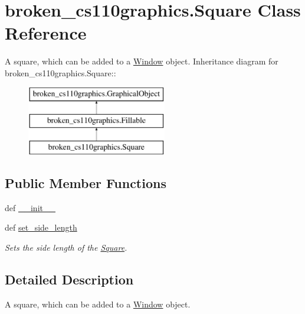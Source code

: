 \hypertarget{classbroken__cs110graphics_1_1Square}{
\section{broken\_\-cs110graphics.Square Class Reference}
\label{classbroken__cs110graphics_1_1Square}
}


A square, which can be added to a \hyperlink{classbroken__cs110graphics_1_1Window}{Window} object.  
Inheritance diagram for broken\_\-cs110graphics.Square::\begin{figure}[H]
\begin{center}
\leavevmode
\includegraphics[height=3cm]{classbroken__cs110graphics_1_1Square}
\end{center}
\end{figure}
\subsection*{Public Member Functions}
\begin{DoxyCompactItemize}
\item 
def \hyperlink{classbroken__cs110graphics_1_1Square_a5225b2da51147ae4f531ee753b304194}{\_\-\_\-init\_\-\_\-}
\item 
def \hyperlink{classbroken__cs110graphics_1_1Square_a773a0cd8c4ecb0c2089fb18840b3525e}{set\_\-side\_\-length}
\begin{DoxyCompactList}\small\item\em Sets the side length of the \hyperlink{classbroken__cs110graphics_1_1Square}{Square}. \item\end{DoxyCompactList}\end{DoxyCompactItemize}


\subsection{Detailed Description}
A square, which can be added to a \hyperlink{classbroken__cs110graphics_1_1Window}{Window} object. 

